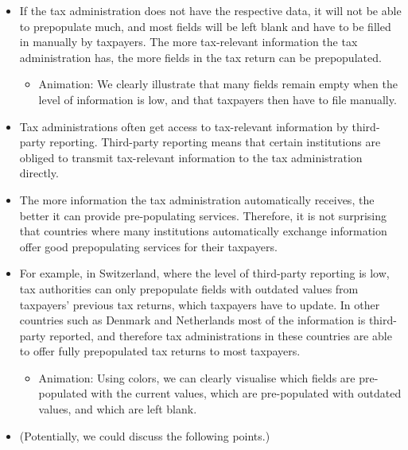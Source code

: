 \documentclass[11pt]{article}
\begin{document}
\begin{itemize}
    \begin{itemize}
        \item Animation: We show what a prepopulated tax return looks like and clearly visualise that many/most fields are already prepopulated, thus reducing the taxpayer's filing burden. 
    \end{itemize}
    \item If the tax administration does not have the respective data, it will not be able to prepopulate much, and most fields will be left blank and have to be filled in manually by taxpayers. The more tax-relevant information the tax administration has, the more fields in the tax return can be prepopulated.
    \begin{itemize}
        \item Animation: We clearly illustrate that many fields remain empty when the level of information is low, and that taxpayers then have to file manually.
    \end{itemize}
    \item Tax administrations often get access to tax-relevant information by third-party reporting. Third-party reporting means that certain institutions are obliged to transmit tax-relevant information to the tax administration directly.
    \item The more information the tax administration automatically receives, the better it can provide pre-populating services. Therefore, it is not surprising that countries where many institutions automatically exchange information offer good prepopulating services for their taxpayers.
    \item For example, in Switzerland, where the level of third-party reporting is low, tax authorities can only prepopulate fields with outdated values from taxpayers’ previous tax returns, which taxpayers have to update. In other countries such as  Denmark and Netherlands most of the information is third-party reported, and therefore tax administrations in these countries are able to offer fully prepopulated tax returns to most taxpayers.
    \begin{itemize}
        \item Animation: Using colors, we can clearly visualise which fields are pre-populated with the current values, which are pre-populated with outdated values, and which are left blank.
    \end{itemize}
    \item (Potentially, we could discuss the following points.)
    \begin{itemize} 

\end{itemize}
\end{itemize}
\end{document}
